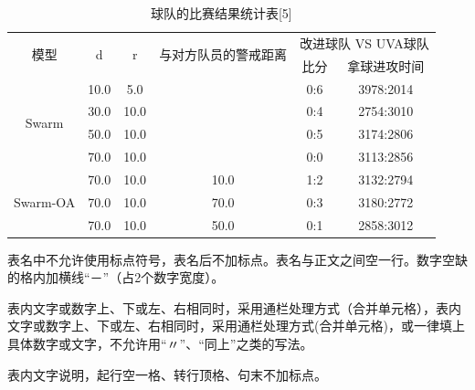 \begin{table}[]
	\caption[表3.2]{球队的比赛结果统计表[5]}
	\label{biao3.2}
	\begin{tabular}{cccccc}
		\hline
		\multirow{2}{*}{模型}       & \multirow{2}{*}{d} & \multirow{2}{*}{r} & \multirow{2}{*}{与对方队员的警戒距离} & \multicolumn{2}{c}{改进球队 VS UVA球队} \\ \cline{5-6} 
		&                    &                    &                             & 比分           & 拿球进攻时间             \\ \hline
		\multirow{4}{*}{Swarm}    & 10.0               & 5.0                &                             & 0:6          & 3978:2014          \\ 
		& 30.0               & 10.0               &                             & 0:4          & 2754:3010          \\ 
		& 50.0               & 10.0               &                             & 0:5          & 3174:2806          \\  
		& 70.0               & 10.0               &                             & 0:0          & 3113:2856          \\\hline
		\multirow{3}{*}{Swarm-OA} & 70.0               & 10.0               & 10.0                        & 1:2          & 3132:2794          \\
		& 70.0               & 10.0               & 70.0                        & 0:3          & 3180:2772          \\
		& 70.0               & 10.0               & 50.0                        & 0:1          & 2858:3012         \\ \hline
	\end{tabular} 
\end{table}

表名中不允许使用标点符号，表名后不加标点。表名与正文之间空一行。数字空缺的格内加横线“－”（占2个数字宽度）。

表内文字或数字上、下或左、右相同时，采用通栏处理方式（合并单元格），表内文字或数字上、下或左、右相同时，采用通栏处理方式(合并单元格)，或一律填上具体数字或文字，不允许用“〃”、“同上”之类的写法。

表内文字说明，起行空一格、转行顶格、句末不加标点。

